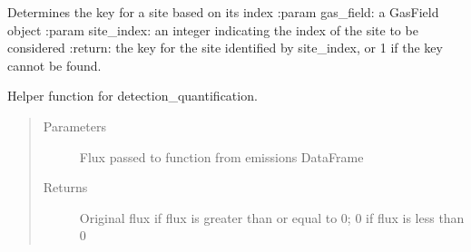\documentclass[letterpaper,10pt,english]{sphinxmanual}
\begin{document}
\begin{fulllineitems}
\begin{fulllineitems}
\begin{quote}
\begin{description}
\end{description}\end{quote}

\end{fulllineitems}


\begin{fulllineitems}
\label{\detokenize{index:feast.DetectionModules.abstract_detection_method.DetectionMethod.find_site_name}}
Determines the key for a site based on its index
:param gas\_field: a GasField object
:param site\_index: an integer indicating the index of the site to be considered
:return: the key for the site identified by site\_index, or \sphinxhyphen{}1 if the key cannot be found.

\end{fulllineitems}


\begin{fulllineitems}
\label{\detokenize{index:feast.DetectionModules.abstract_detection_method.DetectionMethod.flux_val}}
Helper function for detection\_quantification.
\begin{quote}\begin{description}
\item[{Parameters}] \leavevmode
{} \textendash{} Flux passed to function from emissions DataFrame

\item[{Returns}] \leavevmode
Original flux if flux is greater than or equal to 0; 0 if flux is less than 0

\end{description}\end{quote}

\end{fulllineitems}



\end{fulllineitems}
\end{document}
